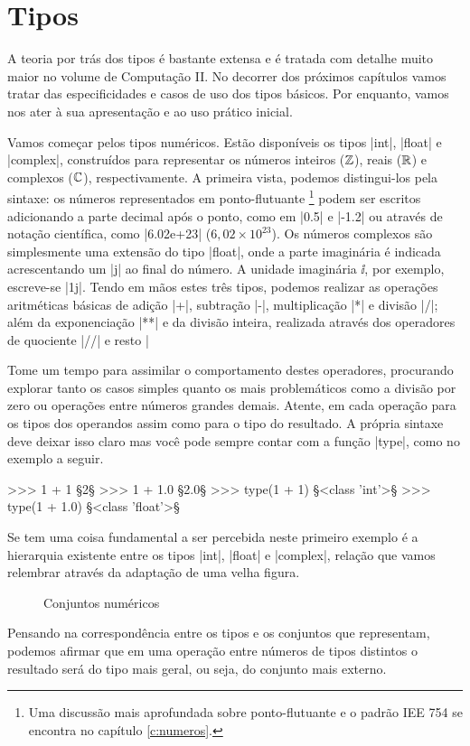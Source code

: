 	\section*{Tipos}%
	A teoria por trás dos tipos é bastante extensa e é tratada com detalhe muito maior no volume de Computação II\cite{xavier:2021}. No decorrer dos próximos capítulos vamos tratar das especificidades e casos de uso dos tipos básicos. Por enquanto, vamos nos ater à sua apresentação e ao uso prático inicial. \par

	Vamos começar pelos tipos numéricos. Estão disponíveis os tipos |int|, |float| e |complex|, construídos para representar os números inteiros ($\mathbb{Z}$), reais ($\mathbb{R}$) e complexos ($\mathbb{C}$), respectivamente. A primeira vista, podemos distingui-los pela sintaxe: os números representados em ponto-flutuante%
	\footnote{Uma discussão mais aprofundada sobre ponto-flutuante e o padrão IEE 754 se encontra no capítulo \ref{c:numeros}.}%
	podem ser escritos adicionando a parte decimal após o ponto, como em |0.5| e |-1.2| ou através de notação científica, como |6.02e+23| ($6,02 \times 10^{23}$). Os números complexos são simplesmente uma extensão do tipo |float|, onde a parte imaginária é indicada acrescentando um |j| ao final do número. A unidade imaginária $\ii$, por exemplo, escreve-se |1j|. Tendo em mãos estes três tipos, podemos realizar as operações aritméticas básicas de adição |+|, subtração |-|, multiplicação |*| e divisão |/|; além da exponenciação |**| e da divisão inteira, realizada através dos operadores de quociente |//| e resto |%

	Tome um tempo para assimilar o comportamento destes operadores, procurando explorar tanto os casos simples quanto os mais problemáticos como a divisão por zero ou operações entre números grandes demais. Atente, em cada operação para os tipos dos operandos assim como para o tipo do resultado. A própria sintaxe deve deixar isso claro mas você pode sempre contar com a função |type|, como no exemplo a seguir.\par
	\begin{pyprompt}
	>>> 1 + 1
	§2§
	>>> 1 + 1.0
	§2.0§
	>>> type(1 + 1)
	§<class 'int'>§
	>>> type(1 + 1.0)
	§<class 'float'>§
	\end{pyprompt}
	Se tem uma coisa fundamental a ser percebida neste primeiro exemplo é a hierarquia existente entre os tipos |int|, |float| e |complex|, relação que vamos relembrar através da adaptação de uma velha figura.
	\begin{figure}[h]
		\label{f:conjuntos}
		\centering
		\medskip
		\caption{Conjuntos numéricos}
	\end{figure}
	Pensando na correspondência entre os tipos e os conjuntos que representam, podemos afirmar que em uma operação entre números de tipos distintos o resultado será do tipo mais geral, ou seja, do conjunto mais externo. \par

